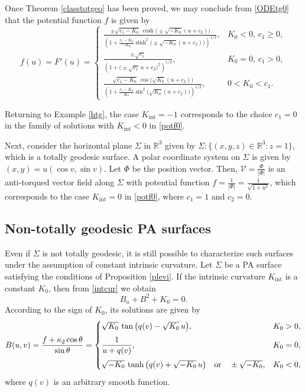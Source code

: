 \documentclass[12pt,reqno]{amsart}
\def\r{\mathbb R}
\def\v{\mathcal V}
\theoremstyle{definition}
\begin{document}
Once Theorem \ref{classtotgeo} has been proved, we may conclude from \eqref{ODEtg0} that the potential function $f$ is given by
\begin{equation}\label{potf0}
f(u)=F'(u)=
\begin{cases}
\displaystyle
\frac{\pm\sqrt{c_1-K_0}\,
\cosh\big(\pm\sqrt{-K_0}(u+c_2)\big)}
{\left(1+\frac{c_1-K_0}{-K_0}
\sinh^2\big(\pm\sqrt{-K_0}(u+c_2)\big)\right)^{1/2}} ,
& K_0<0, \, c_1\geq 0,\\[16pt]
\displaystyle
\frac{\pm\sqrt{c_1}}
{\left(1+\big(\pm\sqrt{c_1}\,u+c_2\big)^2\right)^{1/2}},
& K_0=0, \, c_1>0,\\[16pt]
\displaystyle
\frac{\sqrt{c_1-K_0}\,
\cos\big(\sqrt{K_0}(u+c_2)\big)}
{\left(1+\frac{c_1-K_0}{K_0}
\sin^2\big(\sqrt{K_0}(u+c_2)\big)\right)^{1/2}} ,
& 0<K_0<c_1.
\end{cases}
\end{equation}

Returning to Example \ref{htg}, the case $K_{\mathrm{int}}=-1$ corresponds to the choice $c_1=0$ in the family of solutions with $K_{\mathrm{int}}<0$ in \eqref{potf0}. 

Next, consider the horizontal plane $\Sigma$ in $\r^3$ given by $\Sigma:\{(x,y,z)\in \r^3:z=1\},$ which is a totally geodesic surface. A polar coordinate system on $\Sigma$ is given by $(x,y)=u(\cos v,\sin v)$. Let $\Phi$ be the position vector. Then, $\v=\frac{\Phi}{|\Phi|}$ is an anti-torqued vector field along $\Sigma$ with potential function $f=\frac{1}{|\Phi|}=\frac{1}{\sqrt{1+u^2}}$, which corresponds to the case $K_{\mathrm{int}}=0$ in \eqref{potf0}, where $c_1=1$ and $c_2=0$.

\subsection{Non-totally geodesic PA surfaces}
Even if $\Sigma$ is not totally geodesic, it is still possible to characterize such surfaces under the assumption of constant intrinsic curvature. Let $\Sigma$ be a PA surface satisfying the conditions of Proposition \ref{plevi}. If the intrinsic curvature $K_{\mathrm{int}}$ is a constant $K_0$, then from \eqref{intcur} we obtain
$$
B_u+B^2+K_0=0.
$$
According to the sign of $K_0$, its solutions are given by
\begin{equation}\label{solvb1}
B(u,v)=\frac{f+\kappa_2\cos\theta}{\sin\theta}=
\begin{cases}
\sqrt{K_0}\,\tan\big(q(v)-\sqrt{K_0}\,u\big), & K_0>0,\\[6pt]
\dfrac{1}{u+q(v)}, & K_0=0,\\[10pt]
\sqrt{-K_0}\,\tanh\big(q(v)+\sqrt{-K_0}\,u\big) \quad \textnormal{or} \quad
\pm\sqrt{-K_0},  & K_0<0,
\end{cases}
\end{equation}
where $q(v)$ is an arbitrary smooth function.
\end{document}
